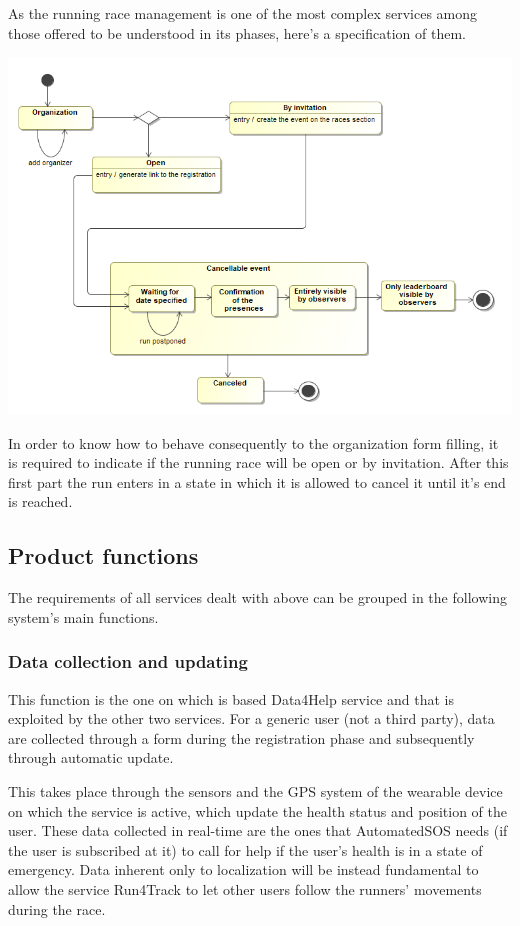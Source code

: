 As the running race management is one of the most complex services among those offered to be understood in its phases, here's a specification of them.

\begin{center}
\includegraphics[scale=0.6]{sections/diagrams/stateDiagram.png}
\end{center}

In order to know how to behave consequently to the organization form filling, it is required to indicate if the running race will be open or by invitation. After this first part the run enters in a state in which it is allowed to cancel it until it's end is reached.

\subsection{Product functions}
The requirements of all services dealt with above can be grouped in the following system's main functions.

\subsubsection{Data collection and updating}
This function is the one on which is based Data4Help service and that is exploited by the other two services. For a generic user (not a third party), data are collected through a form during the registration phase and subsequently through automatic update.

This takes place through the sensors and the GPS system of the wearable device on which the service is active, which update the health status and position of the user. These data collected in real-time are the ones that AutomatedSOS needs (if the user is subscribed at it) to call for help if the user's health is in a state of emergency. Data inherent only to localization will be instead fundamental to allow the service Run4Track to let other users follow the runners' movements during the race.


